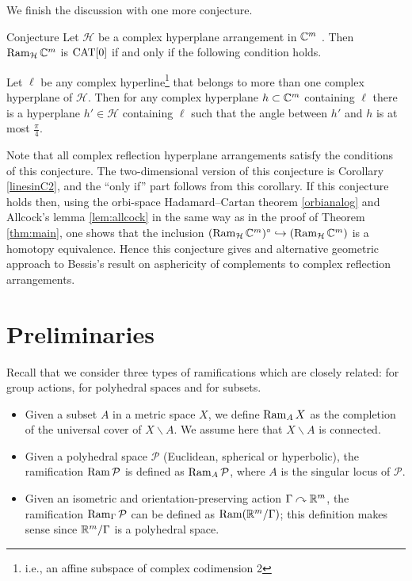 \documentclass[oneside,a4paper]{article}
\def\Ram{\mathop{\rm Ram}\nolimits}
\begin{document}
We finish the discussion with one more conjecture.

\begin{thm}{Conjecture} Let $\mathcal H$ be
a complex hyperplane arrangement in $\mathbb{C}^m$ . Then  $\Ram_{\mathcal H} \CC^m$ is $\mathrm{CAT}[0]$
if and only if the following condition holds.

Let $\ell$ be any complex hyperline\footnote{i.e., an affine subspace of complex codimension 2}
that belongs to more than one complex hyperplane of $\mathcal H$.
Then for any complex hyperplane $h\subset \mathbb{C}^m$ containing $\ell$ there is a hyperplane
$h'\in \mathcal H$ containing $\ell$ such that the angle between
$h'$ and $h$ is at most $\frac{\pi}{4}$.
\end{thm}

Note that all complex reflection hyperplane arrangements satisfy the conditions of this conjecture.
The two-dimensional version of this conjecture is Corollary \ref{linesinC2},
and the ``only if'' part follows from this corollary.
If this conjecture holds then, using the orbi-space Hadamard--Cartan theorem \ref{orbianalog}
and Allcock's lemma \ref{lem:allcock} in the same way as in the proof of Theorem \ref{thm:main},
one shows that the inclusion
$(\Ram_{\mathcal H}\CC^m)^\circ\hookrightarrow(\Ram_{\mathcal H}\CC^m)$ is a homotopy equivalence.
Hence this conjecture gives and alternative geometric approach to Bessis's result  \cite{bessis} on asphericity of complements to complex reflection arrangements.

\section{Preliminaries}\label{sec:prelim}

Recall that we consider three types of ramifications which are closely related:
for group actions, for polyhedral spaces and for subsets.

\begin{itemize}
\item Given a subset $A$ in a metric space $X$, we define $\Ram_A X$ as  the completion of the universal cover of $X\backslash A$. We assume here that $X\backslash A$ is connected.
\item Given a polyhedral space $\mathcal{P}$ (Euclidean, spherical or hyperbolic), the ramification $\Ram \mathcal{P}$ is defined as $\Ram_{A} \mathcal{P}$, where $A$ is the singular locus of $\mathcal{P}$.
\item Given an isometric and orientation-preserving action $\Gamma\curvearrowright\mathbb{R}^m$, the ramification $\Ram_{\Gamma} \mathcal{P}$ can be defined as $\Ram (\RR^m/\Gamma)$;
this definition makes sense since $\mathbb{R}^m/\Gamma$ is a polyhedral space.
\end{itemize}
\end{document}
